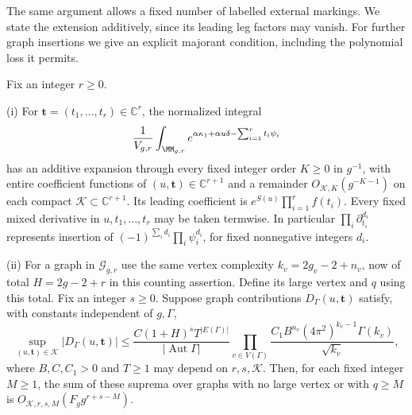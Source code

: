 The same argument allows a fixed number of labelled external
markings. We state the extension additively, since its leading leg
factors may vanish. For further graph insertions we give an explicit
majorant condition, including the polynomial loss it permits.

\begin{crl}
\label{crl:s03:marked-extension}
Fix an integer $r\geq0$.

\textup{(i)} For $\mathbf t=(t_1,\ldots,t_r)\in\mathbb C^r$,
the normalized integral
\begin{equation}
\label{eq:s03:marked-deformation}
\frac1{V_{g,r}}\int_{\MM_{g,r}}
 e^{\alpha\kappa_1+\alpha u\delta-\sum_{i=1}^rt_i\psi_i}
\end{equation}
has an additive expansion through every fixed integer order $K\geq0$
in $g^{-1}$, with
entire coefficient functions of $(u,\mathbf t)\in\mathbb C^{r+1}$
and a remainder $O_{\mathcal K,K}(g^{-K-1})$ on each compact
$\mathcal K\subset\mathbb C^{r+1}$. Its leading coefficient is
$e^{S(u)}\prod_{i=1}^rf(t_i)$.
Every fixed mixed derivative in $u,t_1,\ldots,t_r$ may be taken
termwise. In particular $\prod_i\partial_{t_i}^{d_i}$ represents
insertion of $(-1)^{\sum_i d_i}\prod_i\psi_i^{d_i}$, for fixed
nonnegative integers $d_i$.

\textup{(ii)} For a graph in $\mathcal G_{g,r}$ use the same
vertex complexity $k_v=2g_v-2+n_v$, now of total $H=2g-2+r$ in
this counting assertion. Define its large vertex and $q$ using this
total. Fix an integer $s\geq0$. Suppose graph contributions
$D_\Gamma(u,\mathbf t)$ satisfy, with constants independent of
$g,\Gamma$,
\begin{equation}
\label{eq:s03:decoration-condition}
\sup_{(u,\mathbf t)\in\mathcal K}|D_\Gamma(u,\mathbf t)|
\leq
\frac{C(1+H)^sT^{|E(\Gamma)|}}{|\operatorname{Aut}\Gamma|}
\prod_{v\in V(\Gamma)}
 \frac{C_1B^{n_v}(4\pi^2)^{k_v-1}\Gamma(k_v)}{\sqrt{k_v}},
\end{equation}
where $B,C,C_1>0$ and $T\geq1$ may depend on $r,s,\mathcal K$.
Then, for each fixed integer $M\geq1$, the sum of these suprema
over graphs with no large vertex or with $q\geq M$ is
$O_{\mathcal K,r,s,M}(F_g g^{r+s-M})$.
\end{crl}
